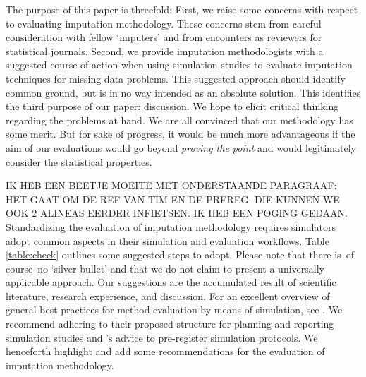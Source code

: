 \documentclass[bimj,fleqn]{w-art}
\begin{document}

The purpose of this paper is threefold: First, we raise some concerns with respect to evaluating imputation methodology. These concerns stem from careful consideration with fellow `imputers' and from encounters as reviewers for statistical journals. Second, we provide imputation methodologists with a suggested course of action when using simulation studies to evaluate imputation techniques for missing data problems. This suggested approach should identify common ground, but is in no way intended as an absolute solution. This identifies the third purpose of our paper: discussion. We hope to elicit critical thinking regarding the problems at hand. We are all convinced that our methodology has some merit. But for sake of progress, it would be much more advantageous if the aim of our evaluations would go beyond \textit{proving the point} and would legitimately consider the statistical properties. 

IK HEB EEN BEETJE MOEITE MET ONDERSTAANDE PARAGRAAF: HET GAAT OM DE REF VAN TIM EN DE PREREG. DIE KUNNEN WE OOK 2 ALINEAS EERDER INFIETSEN. IK HEB EEN POGING GEDAAN.
Standardizing the evaluation of imputation methodology requires simulators adopt common aspects in their simulation and evaluation workflows. Table \ref{table:check} outlines some suggested steps to adopt. Please note that there is--of course--no `silver bullet' and that we do not claim to present a universally applicable approach. Our suggestions are the accumulated result of scientific literature, research experience, and discussion. For an excellent overview of general best practices for method evaluation by means of simulation, see \citet{morr18}. We recommend adhering to their proposed structure for planning and reporting simulation studies and \citet{pawe22}'s advice to pre-register simulation protocols. We henceforth highlight and add some recommendations for the evaluation of imputation methodology. 

\end{document}
